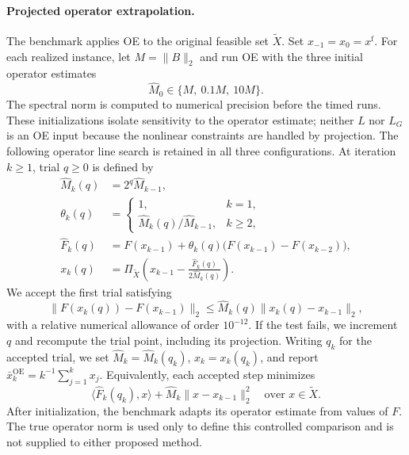 \paragraph{Projected operator extrapolation.}
The benchmark applies OE to the original feasible set $\widetilde X$.
Set $x_{-1}=x_0=x^{\mathrm f}$. For each realized instance, let
$M=\|B\|_2$ and run OE with the three initial operator estimates
\[
\widehat M_0\in\{M,\ 0.1M,\ 10M\}.
\]
The spectral norm is computed to numerical precision before the timed runs.
These initializations isolate sensitivity to the operator estimate; neither
$L$ nor $L_G$ is an OE input because the nonlinear constraints are handled
by projection. The following operator line search is retained in all three
configurations. At iteration
$k\ge1$, trial $q\ge0$ is defined by
\begin{equation}\label{eq:numerical_projected_oe}
\begin{aligned}
\widehat M_k(q)&=2^q\widehat M_{k-1},\\
\theta_k(q)&=
\begin{cases}
1,&k=1,\\
\widehat M_k(q)/\widehat M_{k-1},&k\ge2,
\end{cases}\\
\widehat F_k(q)&=F(x_{k-1})
+\theta_k(q)\bigl(F(x_{k-1})-F(x_{k-2})\bigr),\\
x_k(q)&=\Pi_{\widetilde X}
\left(x_{k-1}-\frac{\widehat F_k(q)}{2\widehat M_k(q)}\right).
\end{aligned}
\end{equation}
We accept the first trial satisfying
\begin{equation}\label{eq:numerical_projected_oe_linesearch}
\|F(x_k(q))-F(x_{k-1})\|_2
\le\widehat M_k(q)\|x_k(q)-x_{k-1}\|_2,
\end{equation}
with a relative numerical allowance of order $10^{-12}$. If the test
fails, we increment $q$ and recompute the trial point, including its
projection. Writing $q_k$ for the accepted trial, we set
$\widehat M_k=\widehat M_k(q_k)$, $x_k=x_k(q_k)$, and report
$\bar x_k^{\mathrm{OE}}=k^{-1}\sum_{j=1}^k x_j$. Equivalently, each
accepted step minimizes
\[
\langle\widehat F_k(q_k),x\rangle
+\widehat M_k\|x-x_{k-1}\|_2^2
\quad\text{over }x\in\widetilde X.
\]
After initialization, the benchmark adapts its operator estimate from values
of $F$. The true operator norm is used only to define this controlled comparison
and is not supplied to either proposed method.

